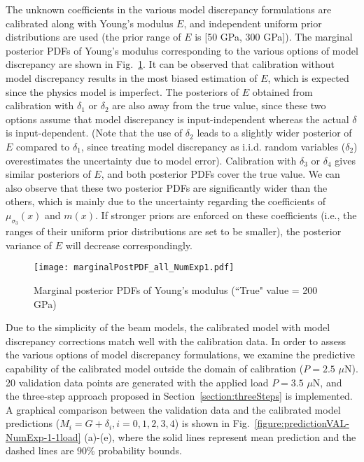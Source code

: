 \documentclass[preprint,review,12pt,3p]{elsarticle}
\begin{document}
The unknown coefficients in the various model discrepancy formulations are calibrated along with Young's modulus $E$, and independent uniform prior distributions are used (the prior range of $E$ is [50 GPa, 300 GPa]). The marginal posterior PDFs of Young's modulus corresponding to the various options of model discrepancy are shown in Fig.~\ref{figure:marginalE}. It can be observed that calibration without model discrepancy results in the most biased estimation of $E$, which is expected since the physics model is imperfect. The posteriors of $E$ obtained from calibration with $\delta_1$ or $\delta_2$ are also away from the true value, since these two options assume that model discrepancy is input-independent whereas the actual $\delta$ is input-dependent. (Note that the use of $\delta_2$ leads to a slightly wider posterior of $E$ compared to $\delta_1$, since treating model discrepancy as i.i.d. random variables ($\delta_2$) overestimates the uncertainty due to model error). Calibration with $\delta_3$ or $\delta_4$ gives similar posteriors of $E$, and both posterior PDFs cover the true value. We can also observe that these two posterior PDFs are significantly wider than the others, which is mainly due to the uncertainty regarding the coefficients of $\mu_{\sigma_3}(x)$ and $m(x)$. If stronger priors are enforced on these coefficients (i.e., the ranges of their uniform prior distributions are set to be smaller), the posterior variance of $E$ will decrease correspondingly. 

\begin{figure}[h!]
\centering
\texttt{[image: marginalPostPDF\_all\_NumExp1.pdf]}
\caption{Marginal posterior PDFs of Young's modulus (``True" value = 200 GPa)}
\label{figure:marginalE}
\end{figure}


Due to the simplicity of the beam models, the calibrated model with model discrepancy corrections match well with the calibration data. In order to assess the various options of model discrepancy formulations, we examine the predictive capability of the calibrated model outside the domain of calibration ($P=2.5$ $\mu$N). 20 validation data points are generated with the applied load $P=3.5$ $\mu$N, and the three-step approach proposed in Section~\ref{section:threeSteps} is implemented. A graphical comparison between the validation data and the calibrated model predictions ($M_i=G+\delta_i, i=0,1,2,3,4$) is shown in Fig.~\ref{figure:predictionVAL-NumExp-1-1load} (a)-(e), where the solid lines represent mean prediction and the dashed lines are $90\%$ probability bounds.
\end{document}
